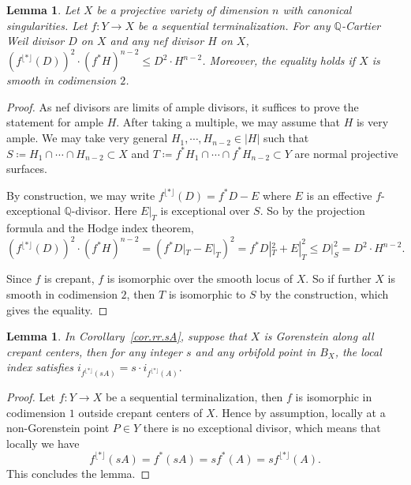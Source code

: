 \documentclass[12pt,twoside]{amsart}
\newtheorem{lem}[thm]{Lemma}
\theoremstyle{definition}
\begin{document}
\begin{lem}\label{lem.DH}
    Let $X$ be a projective variety of dimension $n$ with canonical singularities. Let $f\colon Y\to X$ be a sequential terminalization. For any $\mathbb{Q}$-Cartier Weil divisor $D$ on $X$ and any nef divisor $H$ on $X$, $(f^{\lfloor *\rfloor}(D))^2\cdot (f^*H)^{n-2}\leq D^2\cdot H^{n-2}$. Moreover, the equality holds if $X$ is smooth in codimension $2$. 
\end{lem}

\begin{proof}
    As nef divisors are limits of ample divisors, it suffices to prove the statement for ample $H$. After taking a multiple, we may assume that $H$ is very ample. We may take very general $H_1, \cdots, H_{n-2}\in |H|$ such that $S\coloneq H_1\cap\cdots \cap H_{n-2}\subset X$ and $T\coloneq f^*H_1\cap\cdots \cap f^*H_{n-2}\subset Y$ are normal projective surfaces. 
    
    By construction, we may write $f^{\lfloor *\rfloor}(D)=f^*D-E$ where $E$ is an effective $f$-exceptional $\mathbb{Q}$-divisor. Here $E|_T$ is exceptional over $S$. So by the projection formula and the Hodge index theorem, 
    \[
        (f^{\lfloor *\rfloor}(D))^2\cdot (f^*H)^{n-2}=(f^*D|_T-E|_T)^2=f^*D|_T^2+E|_T^2\leq D|_S^2=D^2\cdot H^{n-2}.
    \]
    
    Since $f$ is crepant, $f$ is isomorphic over the smooth locus of $X$. So
    if further $X$ is smooth in codimension $2$, then $T$ is isomorphic to $S$ by the construction, which gives the equality. 
\end{proof}

\begin{lem}\label{lem.it=ti}
    In Corollary~\ref{cor.rr.sA}, suppose that $X$ is Gorenstein along all crepant centers, then for any integer $s$ and any orbifold point in $B_X$, the local index satisfies $i_{f^{\lfloor *\rfloor}(sA)}=s\cdot i_{f^{\lfloor *\rfloor}(A)}.$ 
\end{lem}
\begin{proof}
    Let $f\colon Y\to X$ be a sequential terminalization, then $f$ is isomorphic in codimension $1$ outside crepant centers of $X$. Hence by assumption, locally at a non-Gorenstein point $P\in Y$ there is no exceptional divisor, which means that locally we have 
    \[
        f^{\lfloor *\rfloor}(sA)=f^*(sA)=sf^*(A)=sf^{\lfloor *\rfloor}(A).
    \]
    This concludes the lemma.
\end{proof}
\end{document}
